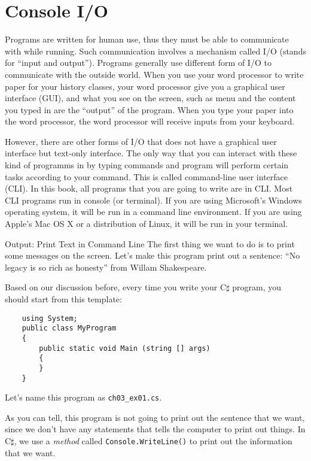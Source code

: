 \documentclass[../main.tex]{subfiles}
\begin{document}
    \section{Console I/O}
Programs are written for human use, thus they must be able to communicate with
while running. Such communication involves a mechanism called I/O (stands
for ``input and output''). Programs generally use different form of I/O to
communicate with the outside world. When you use your word processor to write
paper for your history classes, your word processor give you a graphical user
interface (GUI), and what you see on the screen, such as menu and the content
you typed in are the ``output'' of the program. When you type your paper into
the word processor, the word processor will receive inputs from your keyboard.

However, there are other forms of I/O that does not have a graphical user
interface but text-only interface. The only way that you can interact with these
kind of programms in by typing commands and program will perform certain tasks
according to your command. This is called command-line user interface (CLI). In
this book, all programs that you are going to write are in CLI. Most CLI programs
run in console (or terminal). If you are using Microsoft's Windows operating
system, it will be run in a command line environment. If you are using Apple's
Mac OS X or a distribution of Linux, it will be run in your terminal.

Output: Print Text in Command Line
The first thing we want to do is to print some messages on the screen. Let's
make this program print out a sentence: ``No legacy is so rich as honesty'' from
Willam Shakespeare.

Based on our discussion before, every time you write your C$\sharp$ program, you
should start from this template:

\begin{verbatim}
    using System;
    public class MyProgram
    {
        public static void Main (string [] args)
        {
        }
    }
\end{verbatim}

Let's name this program as \texttt{ch03\_ex01.cs}.

As you can tell, this program is not going to print out the sentence that we
want, since we don't have any statements that tells the computer to print out
things. In C$\sharp$, we use a \emph{method} called \texttt{Console.WriteLine()}
to print out the information that we want.
\end{document}

